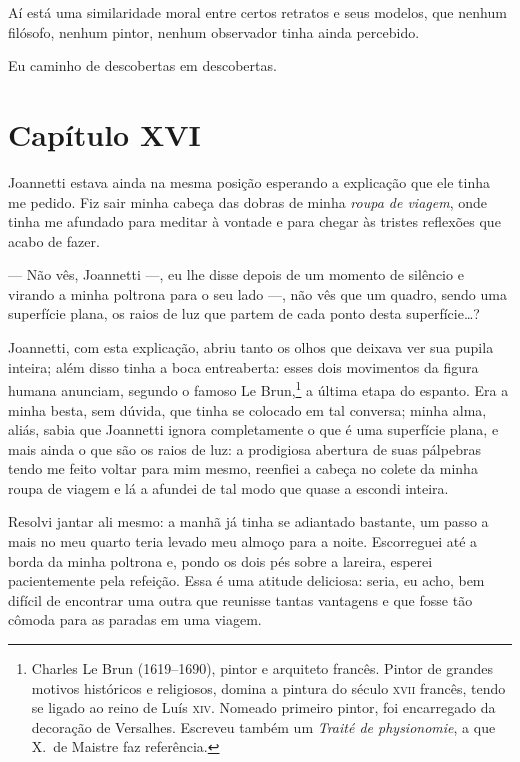Aí está uma similaridade moral entre certos retratos e seus modelos, que
nenhum filósofo, nenhum pintor, nenhum observador tinha ainda
percebido.

Eu caminho de descobertas em descobertas.

\section*{Capítulo XVI}

 Joannetti estava ainda na mesma posição esperando a explicação que ele
tinha me pedido. Fiz sair minha cabeça das dobras de minha
\textit{roupa de viagem}, onde tinha me afundado para meditar à vontade
e para chegar às tristes reflexões que acabo de fazer.  

--- Não vês, Joannetti ---, eu lhe disse depois de um momento de silêncio e
virando a minha poltrona para o seu lado ---, não vês que um quadro, sendo
uma superfície plana, os raios de luz que partem de cada ponto desta
superfície\ldots?

Joannetti, com esta explicação, abriu tanto os olhos que deixava ver sua
pupila inteira; além disso tinha a boca entreaberta: esses dois
movimentos da figura humana anunciam, segundo o famoso Le
Brun,\footnote{ Charles Le Brun (1619--1690), pintor e arquiteto francês.
Pintor de grandes motivos históricos e religiosos, domina a pintura do
século \textsc{xvii} francês, tendo se ligado ao reino de Luís \textsc{xiv}. Nomeado
primeiro pintor, foi encarregado da decoração de Versalhes. Escreveu
também um \textit{Traité de physionomie}, a que X.~de Maistre faz
referência.} a última etapa do espanto. Era a minha besta, sem
dúvida, que tinha se colocado em tal conversa; minha alma, aliás, sabia
que Joannetti ignora completamente o que é uma superfície plana, e mais
ainda o que são os raios de luz: a prodigiosa abertura de suas
pálpebras tendo me feito voltar para mim mesmo, reenfiei a cabeça no
colete da minha roupa de viagem e lá a afundei de tal modo que quase a
escondi inteira.

 Resolvi jantar ali mesmo: a manhã já tinha se adiantado bastante, um
passo a mais no meu quarto teria levado meu almoço para a noite.
Escorreguei até a borda da minha poltrona e, pondo os dois pés sobre a
lareira, esperei pacientemente pela refeição. Essa é uma atitude
deliciosa: seria, eu acho, bem difícil de encontrar uma outra que
reunisse tantas vantagens e que fosse tão cômoda para as paradas em uma
viagem. 

